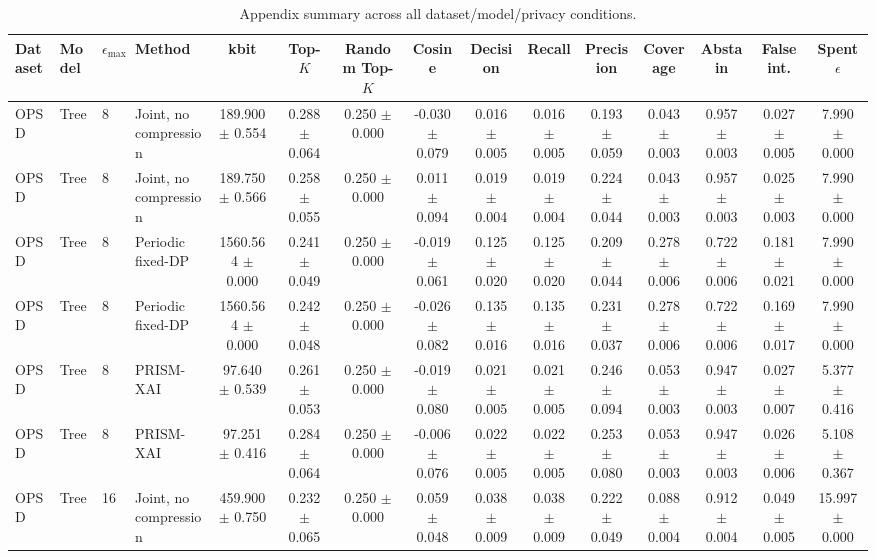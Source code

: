 \begin{table}[t]
\caption{Appendix summary across all dataset/model/privacy conditions.}
\label{tab:appendix-conditions}
\centering
\scriptsize
\setlength{\tabcolsep}{2.5pt}
\begin{tabular}{llllccccccccccc}
\toprule
Dataset & Model & $\epsilon_{\max}$ & Method & kbit & Top-$K$ & Random Top-$K$ & Cosine & Decision & Recall & Precision & Coverage & Abstain & False int. & Spent $\epsilon$ \\
\midrule
OPSD & Tree & 8 & Joint, no compression & 189.900 $\pm$ 0.554 & 0.288 $\pm$ 0.064 & 0.250 $\pm$ 0.000 & -0.030 $\pm$ 0.079 & 0.016 $\pm$ 0.005 & 0.016 $\pm$ 0.005 & 0.193 $\pm$ 0.059 & 0.043 $\pm$ 0.003 & 0.957 $\pm$ 0.003 & 0.027 $\pm$ 0.005 & 7.990 $\pm$ 0.000 \\
OPSD & Tree & 8 & Joint, no compression & 189.750 $\pm$ 0.566 & 0.258 $\pm$ 0.055 & 0.250 $\pm$ 0.000 & 0.011 $\pm$ 0.094 & 0.019 $\pm$ 0.004 & 0.019 $\pm$ 0.004 & 0.224 $\pm$ 0.044 & 0.043 $\pm$ 0.003 & 0.957 $\pm$ 0.003 & 0.025 $\pm$ 0.003 & 7.990 $\pm$ 0.000 \\
OPSD & Tree & 8 & Periodic fixed-DP & 1560.564 $\pm$ 0.000 & 0.241 $\pm$ 0.049 & 0.250 $\pm$ 0.000 & -0.019 $\pm$ 0.061 & 0.125 $\pm$ 0.020 & 0.125 $\pm$ 0.020 & 0.209 $\pm$ 0.044 & 0.278 $\pm$ 0.006 & 0.722 $\pm$ 0.006 & 0.181 $\pm$ 0.021 & 7.990 $\pm$ 0.000 \\
OPSD & Tree & 8 & Periodic fixed-DP & 1560.564 $\pm$ 0.000 & 0.242 $\pm$ 0.048 & 0.250 $\pm$ 0.000 & -0.026 $\pm$ 0.082 & 0.135 $\pm$ 0.016 & 0.135 $\pm$ 0.016 & 0.231 $\pm$ 0.037 & 0.278 $\pm$ 0.006 & 0.722 $\pm$ 0.006 & 0.169 $\pm$ 0.017 & 7.990 $\pm$ 0.000 \\
OPSD & Tree & 8 & PRISM-XAI & 97.640 $\pm$ 0.539 & 0.261 $\pm$ 0.053 & 0.250 $\pm$ 0.000 & -0.019 $\pm$ 0.080 & 0.021 $\pm$ 0.005 & 0.021 $\pm$ 0.005 & 0.246 $\pm$ 0.094 & 0.053 $\pm$ 0.003 & 0.947 $\pm$ 0.003 & 0.027 $\pm$ 0.007 & 5.377 $\pm$ 0.416 \\
OPSD & Tree & 8 & PRISM-XAI & 97.251 $\pm$ 0.416 & 0.284 $\pm$ 0.064 & 0.250 $\pm$ 0.000 & -0.006 $\pm$ 0.076 & 0.022 $\pm$ 0.005 & 0.022 $\pm$ 0.005 & 0.253 $\pm$ 0.080 & 0.053 $\pm$ 0.003 & 0.947 $\pm$ 0.003 & 0.026 $\pm$ 0.006 & 5.108 $\pm$ 0.367 \\
OPSD & Tree & 16 & Joint, no compression & 459.900 $\pm$ 0.750 & 0.232 $\pm$ 0.065 & 0.250 $\pm$ 0.000 & 0.059 $\pm$ 0.048 & 0.038 $\pm$ 0.009 & 0.038 $\pm$ 0.009 & 0.222 $\pm$ 0.049 & 0.088 $\pm$ 0.004 & 0.912 $\pm$ 0.004 & 0.049 $\pm$ 0.005 & 15.997 $\pm$ 0.000 \\

\end{tabular}
\end{table}

